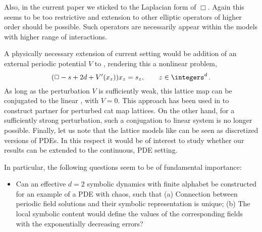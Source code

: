 \begin{description}
{Also,  in the
current paper we sticked to  the Laplacian  form of $\Box$.   Again this
seems to be too restrictive and extension to other elliptic  operators of
higher order should be possible. Such operators are necessarily appear
within the models with higher range of interactions.

A physically necessary extension of  current setting would be addition of an
external periodic potential ${V}$ to , rendering this a
nonlinear problem,
 \begin{equation}
 (\Box - s+ 2d+ {V}'(\ssp_z)) \ssp_z = \Ssym{z}, \qquad z\in \integers^{d}
 \,. \label{LinearConnPerturbed}
\end{equation}
As long as the perturbation ${V}$ is sufficiently weak, this lattice map can
be conjugated to the linear {\catlatt}, with ${V}=0$.
This approach has been used in  to construct partner
{\twots} for perturbed cat map lattices.
On the other hand, for a sufficiently strong perturbation, such a conjugation
to linear system is no longer possible. Finally, let us note that the lattice
models like   can be seen  as discretized versions
of PDEs.
In this respect it would be of  interest  to study whether our results  can
be extended to the continuous, PDE setting.

In particular,  the following
questions  seem to be  of fundamental importance:

 \begin{itemize}
\item
 Can  an effective $d=2$ symbolic dynamics with finite alphabet  be
 constructed for an example of a PDE with {\spt} chaos, such
 that
 (a)  Connection between periodic field  solutions and their
 symbolic representation is unique;
 (b) The local  symbolic content would
 define  the values of the corresponding fields with the exponentially
 decreasing errors?
\end{itemize}

    }




\end{description}
